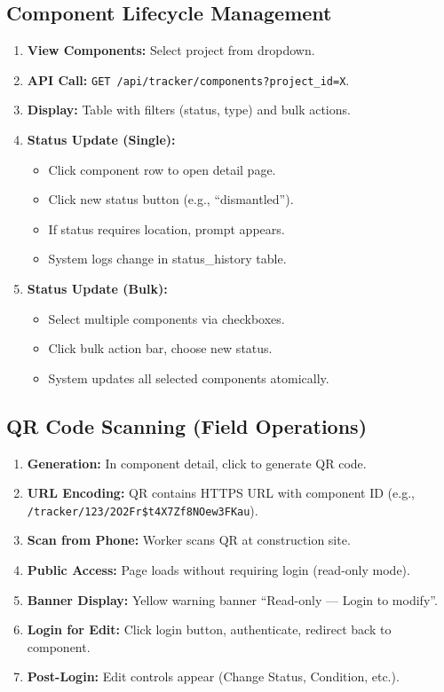 \documentclass[11pt,a4paper]{article}
\begin{document}
\subsection{Component Lifecycle Management}

\begin{enumerate}[leftmargin=*]
    \item \textbf{View Components:} Select project from dropdown.
    \item \textbf{API Call:} \texttt{GET /api/tracker/components?project\_id=X}.
    \item \textbf{Display:} Table with filters (status, type) and bulk actions.
    \item \textbf{Status Update (Single):}
        \begin{itemize}
            \item Click component row to open detail page.
            \item Click new status button (e.g., ``dismantled'').
            \item If status requires location, prompt appears.
            \item System logs change in status\_history table.
        \end{itemize}
    \item \textbf{Status Update (Bulk):}
        \begin{itemize}
            \item Select multiple components via checkboxes.
            \item Click bulk action bar, choose new status.
            \item System updates all selected components atomically.
        \end{itemize}
\end{enumerate}

\subsection{QR Code Scanning (Field Operations)}

\begin{enumerate}[leftmargin=*]
    \item \textbf{Generation:} In component detail, click to generate QR code.
    \item \textbf{URL Encoding:} QR contains HTTPS URL with component ID (e.g., \texttt{/tracker/123/2O2Fr\$t4X7Zf8NOew3FKau}).
    \item \textbf{Scan from Phone:} Worker scans QR at construction site.
    \item \textbf{Public Access:} Page loads without requiring login (read-only mode).
    \item \textbf{Banner Display:} Yellow warning banner ``Read-only --- Login to modify''.
    \item \textbf{Login for Edit:} Click login button, authenticate, redirect back to component.
    \item \textbf{Post-Login:} Edit controls appear (Change Status, Condition, etc.).
\end{enumerate}
\end{document}
